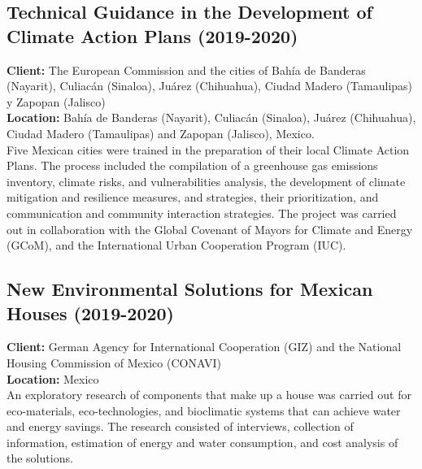 \documentclass[
	a4paper,
	12pt,
	unnumberedsections,
]{CSSullivanBusinessReport}
\begin{document}
\subsection{Technical Guidance in the Development of Climate Action Plans (2019-2020)}
\textbf{Client:}  The European Commission and the cities of Bahía de Banderas (Nayarit), Culiacán (Sinaloa), Juárez (Chihuahua), Ciudad Madero (Tamaulipas) y Zapopan (Jalisco) \\
\textbf{Location:}  Bahía de Banderas (Nayarit), Culiacán (Sinaloa), Juárez (Chihuahua), Ciudad Madero (Tamaulipas) and Zapopan (Jalisco), Mexico. \\[0.5em]
 Five Mexican cities were trained in the preparation of their local Climate Action Plans. The process included the compilation of a greenhouse gas emissions inventory, climate risks, and vulnerabilities analysis, the development of climate mitigation and resilience measures, and strategies, their prioritization, and communication and community interaction strategies. The project was carried out in collaboration with the Global Covenant of Mayors for Climate and Energy (GCoM), and the International Urban Cooperation Program (IUC).

\subsection{New Environmental Solutions for Mexican Houses (2019-2020)}
\textbf{Client:}  German Agency for International Cooperation (GIZ) and the National Housing Commission of Mexico (CONAVI) \\
\textbf{Location:}  Mexico \\[0.5em]
 An exploratory research of components that make up a house was carried out for eco-materials, eco-technologies, and bioclimatic systems that can achieve water and energy savings. The research consisted of interviews, collection of information, estimation of energy and water consumption, and cost analysis of the solutions.
\end{document}
